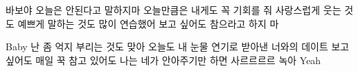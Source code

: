\documentclass{oblivoir}
\begin{document}
바보야 오늘은
안된다고 말하지마
오늘만큼은 내게도
꼭 기회를 줘
사랑스럽게 웃는 것도
예쁘게 말하는 것도
많이 연습했어
보고 싶어도 참으라고 하지 마

Baby 난 좀 억지 부리는 것도 맞아
오늘도 내 눈물 연기로
받아낸 너와의 데이트
보고 싶어도
매일 꾹 참고 있어도
나는 네가 안아주기만 하면
사르르르르 녹아 Yeah
\end{document}
